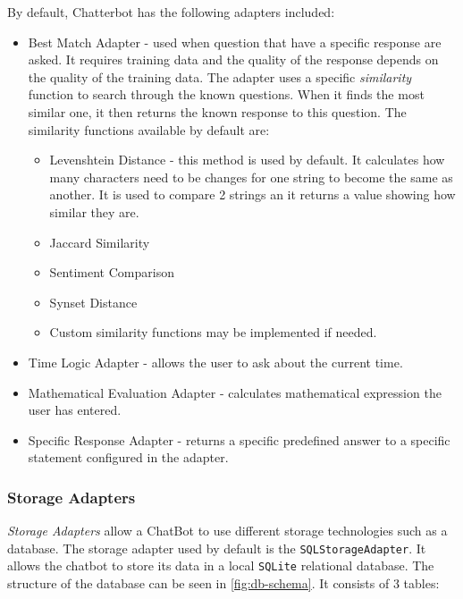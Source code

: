 \documentclass[12pt,a4paper]{article}
\begin{document}
By default, Chatterbot has the following adapters included:
\begin{itemize}
    \item Best Match Adapter - used when question that have a specific response are asked. It requires training data and the quality of the response depends on the quality of the training data. The adapter uses a specific \textit{similarity} function to search through the known questions. When it finds the most similar one, it then returns the known response to this question. The similarity functions available by default are:
        \begin{itemize}
            \item Levenshtein Distance - this method is used by default. It calculates how many characters need to be changes 
            for one string to become the same as another. It is used to compare 2 strings an it returns a value showing how similar they are.
            \item Jaccard Similarity
            \item Sentiment Comparison
            \item Synset Distance
            \item Custom similarity functions may be implemented if needed.
        \end{itemize}
    \item Time Logic Adapter - allows the user to ask about the current time.
    \item Mathematical Evaluation Adapter - calculates mathematical expression the user has entered.
    \item Specific Response Adapter - returns a specific predefined answer to a specific statement configured in the adapter.
\end{itemize}

\subsubsection{Storage Adapters}
\textit{Storage Adapters} allow a ChatBot to use different storage technologies such as a database. The storage adapter used by default is the \texttt{SQLStorageAdapter}. It allows the chatbot to store its data in a local \texttt{SQLite} relational database. The structure of the database can be seen in \cref{fig:db-schema}. It consists of 3 tables:
\end{document}
